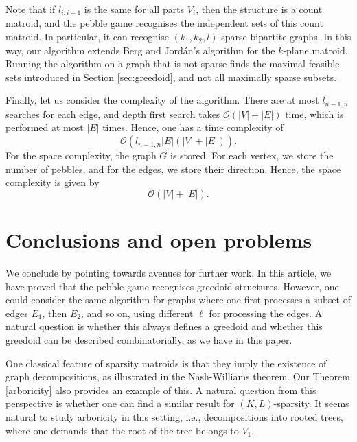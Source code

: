 \documentclass{article}
\begin{document}
Note that if $l_{i,i+1}$ is the same for all parts $V_i$, then the structure is a count matroid, and the pebble game recognises the independent sets of this count matroid. In particular, it can recognise $(k_1,k_2,l)$-sparse bipartite graphs. In this way, our algorithm extends Berg and Jord\'an's algorithm for the $k$-plane matroid. Running the algorithm on a graph that is not sparse finds the maximal feasible sets introduced in Section \ref{sec:greedoid}, and not all maximally sparse subsets.

Finally, let us consider the complexity of the algorithm. There are at most $l_{n-1, n}$ searches for each edge, and depth first search takes $\mathcal{O}(|V|+|E|)$ time, which is performed at most $|E|$ times. Hence, one has a time complexity of 
\begin{equation*}
    \mathcal{O}\left(l_{n-1, n}|E|\left(|V|+|E|\right)\right).
\end{equation*}
For the space complexity, the graph $G$ is stored. For each vertex, we store the number of pebbles, and for the edges, we store their direction. Hence, the space complexity is given by
\begin{equation*}
\mathcal{O}(|V|+|E|).
\end{equation*}


\section{Conclusions and open problems}\label{sec:conc,prob}


    We conclude by pointing towards avenues for further work. In this article, we have proved that the pebble game recognises greedoid structures. However, one could consider the same algorithm for graphs where one first processes a subset of edges $E_1$, then $E_2$, and so on, using different $\ell$ for processing the edges. A natural question is whether this always defines a greedoid and whether this greedoid can be described combinatorially, as we have in this paper.
    
One classical feature of sparsity matroids is that they imply the existence of graph decompositions, as illustrated in the Nash-Williams theorem. Our Theorem \ref{arboricity} also provides an example of this. A natural question from this perspective is whether one can find a similar result for $(K,L)$-sparsity. It seems natural to study arboricity in this setting, i.e., decompositions into rooted trees, where one demands that the root of the tree belongs to $V_1$. 
\end{document}
